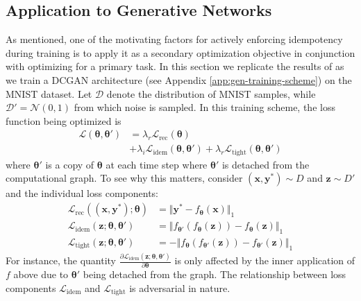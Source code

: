 \documentclass{article}
\theoremstyle{plain}
\theoremstyle{definition}
\theoremstyle{remark}
\newcommand{\vx}{\mathbf{x}}
\newcommand{\vy}{\mathbf{y}}
\newcommand{\vz}{\mathbf{z}}
\newcommand{\vtheta}{\bm{\theta}}
\newcommand{\pd}[2]{\frac{\partial{#1}}{\partial{#2}}}
\begin{document}
\subsection{Application to Generative Networks}
\label{sec:experiment-gen}
As mentioned, one of the motivating factors for actively enforcing idempotency during training is to apply it as a secondary optimization objective in conjunction with optimizing for a primary task. In this section we replicate the results of \citealt{shocher-ign} as we train a DCGAN architecture (see Appendix \ref{app:gen-training-scheme}) on the MNIST dataset. Let $\mathcal{D}$ denote the distribution of MNIST samples, while $\mathcal{D}' = \mathcal{N}(0, 1)$ from which noise is sampled. In this training scheme, the loss function being optimized is
%
\begin{align}
    \mathcal{L}{(\vtheta, \vtheta')} & = \lambda_r \mathcal{L}_{\mathrm{rec}}{(\vtheta)} \label{eq:gan-loss}                                                                \\
                                     & + \lambda_i \mathcal{L}_{\mathrm{idem}}{(\vtheta, \vtheta')} + \lambda_r \mathcal{L}_{\mathrm{tight}}{(\vtheta, \vtheta')} \nonumber
\end{align}
%
where $\vtheta'$ is a copy of $\vtheta$ at each time step where $\vtheta'$ is detached from the computational graph. To see why this matters, consider $(\vx, \vy^*) \sim D$ and $\vz \sim D'$ and the individual loss components:
%
\begin{align*}
    \mathcal{L}_{\mathrm{rec}}{((\vx, \vy^*); \vtheta)}    & = \Vert \vy^* - f_{\vtheta}(\vx) \Vert_1                            \\
    \mathcal{L}_{\mathrm{idem}}{(\vz; \vtheta, \vtheta')}  & = \Vert f_{\vtheta'}(f_{\vtheta}(\vz)) - f_{\vtheta}(\vz) \Vert_1   \\
    \mathcal{L}_{\mathrm{tight}}{(\vz; \vtheta, \vtheta')} & = -\Vert f_{\vtheta}(f_{\vtheta'}(\vz)) - f_{\vtheta'}(\vz) \Vert_1
\end{align*}
%
For instance, the quantity $\pd{\mathcal{L}_{\mathrm{idem}}{(\vz; \vtheta, \vtheta')}}{\vtheta}$ is only affected by the inner application of $f$ above due to $\vtheta'$ being detached from the graph. The relationship between loss components $\mathcal{L}_{\mathrm{idem}}$ and $\mathcal{L}_{\mathrm{tight}}$ is adversarial in nature.
\end{document}
